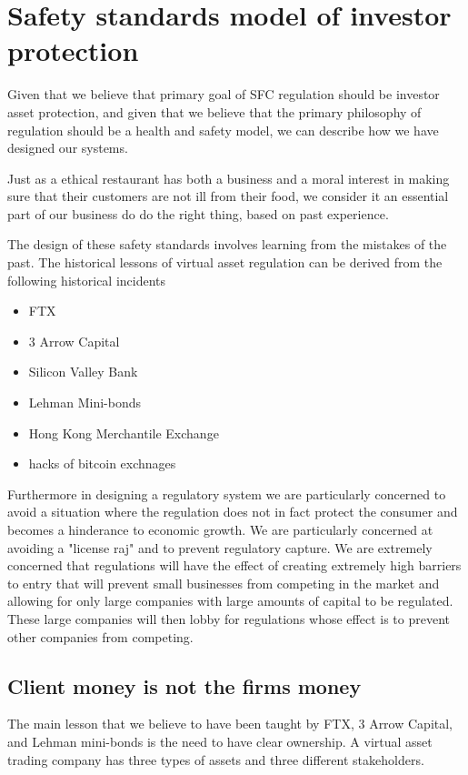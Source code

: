 \section{Safety standards model of investor protection}

Given that we believe that primary goal of SFC regulation should be
investor asset protection, and given that we believe that the primary
philosophy of regulation should be a health and safety model, we can
describe how we have designed our systems.

Just as a ethical restaurant has both a business and a moral interest
in making sure that their customers are not ill from their food, we
consider it an essential part of our business do do the right thing,
based on past experience.

The design of these safety standards involves learning from the
mistakes of the past.  The historical lessons of virtual asset
regulation can be derived from the following historical incidents

\begin{itemize}
\item FTX
\item  3 Arrow Capital
\item Silicon Valley Bank
\item Lehman Mini-bonds
\item Hong Kong Merchantile Exchange
\item hacks of bitcoin exchnages
  \end{itemize}

Furthermore in designing a regulatory system we are particularly
concerned to avoid a situation where the regulation does not in fact
protect the consumer and becomes a hinderance to economic growth.  We
are particularly concerned at avoiding a "license raj" and to prevent
regulatory capture.  We are extremely concerned that regulations will
have the effect of creating extremely high barriers to entry that will
prevent small businesses from competing in the market and allowing for
only large companies with large amounts of capital to be regulated.
These large companies will then lobby for regulations whose effect is
to prevent other companies from competing.

\subsection{Client money is not the firms money}

The main lesson that we believe to have been taught by FTX, 3 Arrow
Capital, and Lehman mini-bonds is the need to have clear ownership.  A
virtual asset trading company has three types of assets and three 
different stakeholders.

